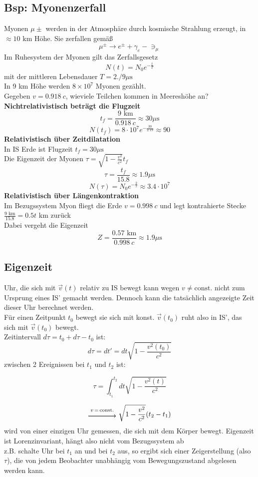 \documentclass[titlepage,12pt,a4paper,ngerman]{report}
\newcommand{\tx}[1]{\textrm{#1}}
\newcommand{\const}{\tx{const.}}
\newcommand{\frbox}[2]{\begin{tcolorbox}[colback=white,colframe=red!75!black,fonttitle=\bfseries,title=#1]#2\end{tcolorbox}} %
\begin{document}
{\subsection*{Bsp: Myonenzerfall}
Myonen $ \mu \pm $ werden in der Atmosphäre durch kosmische Strahlung erzeugt, in $ \approx 10 \tx{ km} $ Höhe. Sie zerfallen gemäß
$$ \mu ^\pm \rightarrow e^\pm + \gamma_{e} - \ni _{\mu}$$
Im Ruhesystem der Myonen gilt das Zerfallsgesetz
$$ N(t) = N_0 e^{-\frac{t}{T}} $$
mit der mittleren Lebensdauer $ T = 2./9 \mu \tx{s} $\\
In 9 km Höhe werden $ 8 \times 10^7 $ Myonen gezählt.\\
Gegeben $ v = 0.918 \ c $, wieviele Teilchen kommen in Meereshöhe an?\\
\textbf{Nichtrelativistisch beträgt die Flugzeit}\\
$$t_{f} = \frac{9 \tx{ km}}{0.918 \ c} \approx 30 \mu \tx{s}$$
$$N(t_{f}) = 8 \cdot 10^7 e^{-\frac{30}{2.19}} \approx 90$$
\textbf{Relativistisch über Zeitdilatation}\\
In IS Erde ist Flugzeit $ t_{f} = 30 \mu \tx{s} $\\
Die Eigenzeit der Myonen $ \tau = \sqrt{1-\frac{v^2}{c^2}} t_{f} $
$$\tau = \frac{t_{f}}{15.8} \approx 1.9 \mu \tx{s}$$
$$N(\tau) = N_0 e^{-\frac{2}{\tau}} \approx 3.4 \cdot 10^7$$
\textbf{Relativistisch über Längenkontraktion}\\
Im Bezugssystem Myon fliegt die Erde $ v = 0.998 \ c $ und legt kontrahierte Stecke $ \frac{9 \tx{ km}}{15.8} = 0.5t \tx{ km} $ zurück\\
Dabei vergeht die Eigenzeit
$$Z = \frac{0.57 \tx{ km}}{0.998 \ c} \approx 1.9 \mu \tx{s}$$


\subsection{Eigenzeit}
Uhr, die sich mit $ \vec{v}(t) $  relativ zu IS bewegt kann wegen $ v \neq \const $ nicht zum Ursprung eines IS' gemacht werden. Dennoch kann die tatsächlich angezeigte Zeit dieser Uhr berechnet werden.\\
Für einen Zeitpunkt $ t_0 $ bewegt sie sich mit konst. $ \vec{v}(t_0) $ ruht also in IS', das sich mit $ \vec{v}(t_0) $ bewegt.\\
Zeitintervall $ d \tau = t_0 + d\tau - t_0 $ ist:
$$ d\tau = dt' = dt \sqrt{1-\frac{v^2(t_0)}{c^2}}$$
zwischen 2 Ereignissen bei $ t_1 $ und $ t_2 $ ist:
\frbox{Eigenzeit}{$$ \tau = \int_{t_1}^{t_2} dt \sqrt{1 - \frac{v^2(t)}{c^2}}$$}
$$\begin{tikzpicture}
\draw[thick,->] (0,0) -- (1.4,0);
\node at (.7,.3) {$ \substack{v\, =\, \const} $};
\end{tikzpicture} \ \sqrt{1 - \frac{v^2}{c^2}} (t_2 - t_1)$$
wird von einer einzigen Uhr gemessen, die sich mit dem Körper bewegt. Eigenzeit ist Lorenzinvariant, hängt also nicht vom Bezugssystem ab\\
z.B. schalte Uhr bei $ t_1 $ an und bei $ t_2 $ aus, so ergibt sich einer Zeigerstellung (also $ \tau $), die von jedem Beobachter unabhängig vom Bewegungszustand abgelesen werden kann.

}
\end{document}
